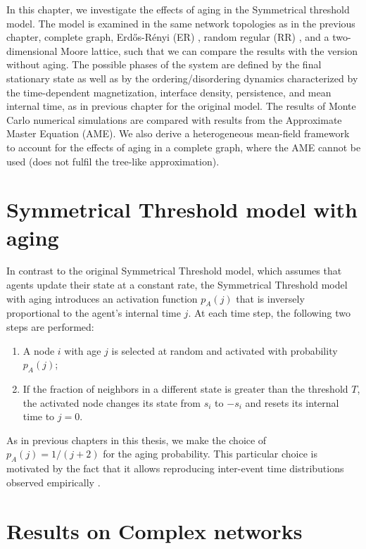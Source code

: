 In this chapter, we investigate the effects of aging in the Symmetrical threshold model. The model is examined in the same network topologies as in the previous chapter, complete graph, Erd\H{o}s-Rényi (ER)  \cite{erdos1960evolution}, random regular (RR) \cite{wormald_1999}, and a two-dimensional Moore lattice, such that we can compare the results with the version without aging. The possible phases of the system are defined by the final stationary state as well as by the ordering/disordering dynamics characterized by the time-dependent magnetization, interface density, persistence, and mean internal time, as in previous chapter for the original model. The results of Monte Carlo numerical simulations are compared with results from the Approximate Master Equation (AME). We also derive a heterogeneous mean-field framework to account for the effects of aging in a complete graph, where the AME cannot be used (does not fulfil the tree-like approximation).
	
\section{\label{Symmetrical Threshold model with aging} Symmetrical Threshold model with aging}
	
In contrast to the original Symmetrical Threshold model, which assumes that agents update their state at a constant rate, the Symmetrical Threshold model with aging introduces an activation function $p_A (j)$ that is inversely proportional to the agent's internal time $j$. At each time step, the following two steps are performed:

\begin{enumerate}
    \item A node $i$ with age $j$ is selected at random and activated with probability $p_A(j)$;
    \item If the fraction of neighbors in a different state is greater than the threshold $T$, the activated node changes its state from $s_i$ to $-s_i$ and resets its internal time to $j=0$.
\end{enumerate}

As in previous chapters in this thesis, we make the choice of $p_A(j) = 1/(j+2)$ for the aging probability. This particular choice is motivated by the fact that it allows reproducing inter-event time distributions observed empirically \cite{rybski-2009,artime-2017}. 

\section{\label{sec:Dynamics on networks} Results on Complex networks}


